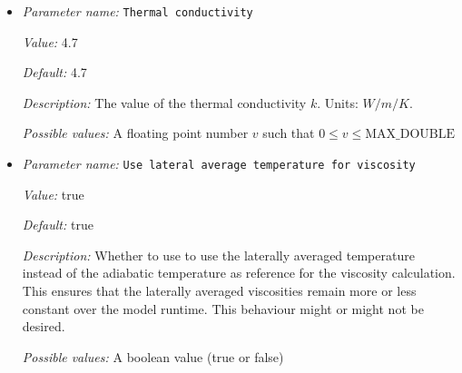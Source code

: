 \begin{itemize}
{\it Value:} 1e23


{\it Default:} 1e23


{\it Description:} The reference viscosity that is used for pressure scaling. To understand how pressure scaling works, take a look at \cite{KHB12}. In particular, the value of this parameter would not affect the solution computed by \aspect{} if we could do arithmetic exactly; however, computers do arithmetic in finite precision, and consequently we need to scale quantities in ways so that their magnitudes are roughly the same. As explained in \cite{KHB12}, we scale the pressure during some computations (never visible by users) by a factor that involves a reference viscosity. This parameter describes this reference viscosity.

For problems with a constant viscosity, you will generally want to choose the reference viscosity equal to the actual viscosity. For problems with a variable viscosity, the reference viscosity should be a value that adequately represents the order of magnitude of the viscosities that appear, such as an average value or the value one would use to compute a Rayleigh number.

Units: $Pa \, s$


{\it Possible values:} A floating point number $v$ such that $0 \leq v \leq \text{MAX\_DOUBLE}$
\item {\it Parameter name:} {\tt Thermal conductivity}
\label{parameters:Material model/Steinberger model/Thermal conductivity}


{\it Value:} 4.7


{\it Default:} 4.7


{\it Description:} The value of the thermal conductivity $k$. Units: $W/m/K$.


{\it Possible values:} A floating point number $v$ such that $0 \leq v \leq \text{MAX\_DOUBLE}$
\item {\it Parameter name:} {\tt Use lateral average temperature for viscosity}
\label{parameters:Material model/Steinberger model/Use lateral average temperature for viscosity}


{\it Value:} true


{\it Default:} true


{\it Description:} Whether to use to use the laterally averaged temperature instead of the adiabatic temperature as reference for the viscosity calculation. This ensures that the laterally averaged viscosities remain more or less constant over the model runtime. This behaviour might or might not be desired.


{\it Possible values:} A boolean value (true or false)
\end{itemize}

